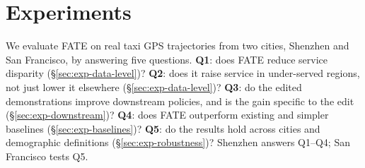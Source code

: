 \section{Experiments}\label{sec:experiments}

We evaluate FATE on real taxi GPS trajectories from two cities, Shenzhen and
San Francisco, by answering five questions.
\textbf{Q1}: does FATE reduce service disparity
(\S\ref{sec:exp-data-level})?
\textbf{Q2}: does it raise service in under-served regions, not just lower it
elsewhere (\S\ref{sec:exp-data-level})?
\textbf{Q3}: do the edited demonstrations improve downstream policies, and is
the gain specific to the edit (\S\ref{sec:exp-downstream})?
\textbf{Q4}: does FATE outperform existing and simpler baselines
(\S\ref{sec:exp-baselines})?
\textbf{Q5}: do the results hold across cities and demographic definitions
(\S\ref{sec:exp-robustness})?
Shenzhen answers Q1--Q4; San Francisco tests Q5.

